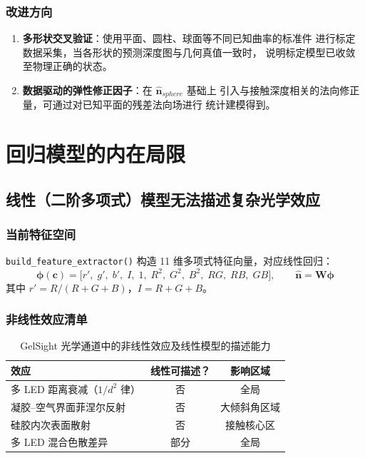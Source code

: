\documentclass[12pt, a4paper]{ctexart}
\begin{document}
\subsubsection*{改进方向}

\begin{enumerate}
  \item \textbf{多形状交叉验证}：使用平面、圆柱、球面等不同已知曲率的标准件
        进行标定数据采集，当各形状的预测深度图与几何真值一致时，
        说明标定模型已收敛至物理正确的状态。
  \item \textbf{数据驱动的弹性修正因子}：在 $\hat{\mathbf{n}}_{sphere}$ 基础上
        引入与接触深度相关的法向修正量，可通过对已知平面的残差法向场进行
        统计建模得到。
\end{enumerate}

\section{回归模型的内在局限}
\label{sec:regression}

\subsection{线性（二阶多项式）模型无法描述复杂光学效应}
\label{subsec:linear_model}

\subsubsection*{当前特征空间}

\texttt{build\_feature\_extractor()} 构造 11 维多项式特征向量，对应线性回归：
\[
  \boldsymbol{\phi}(\mathbf{c}) = \bigl[
    r',\; g',\; b',\; I,\; 1,\; R^2,\; G^2,\; B^2,\; RG,\; RB,\; GB
  \bigr], \qquad
  \hat{\mathbf{n}} = \mathbf{W}\boldsymbol{\phi}
\]
其中 $r' = R/(R+G+B)$，$I = R+G+B$。

\subsubsection*{非线性效应清单}

\begin{table}[h]
  \centering
  \caption{GelSight 光学通道中的非线性效应及线性模型的描述能力}
  \label{tab:nonlinear}
  \begin{tabular}{lcc}
    \toprule
    \textbf{效应}                      & \textbf{线性可描述？} & \textbf{影响区域} \\
    \midrule
    多 LED 距离衰减（$1/d^2$ 律）      & 否                    & 全局              \\
    凝胶--空气界面菲涅尔反射            & 否                    & 大倾斜角区域      \\
    硅胶内次表面散射                    & 否                    & 接触核心区        \\
    多 LED 混合色散差异                 & 部分                  & 全局              \\
    \bottomrule
  \end{tabular}
\end{table}
\end{document}
